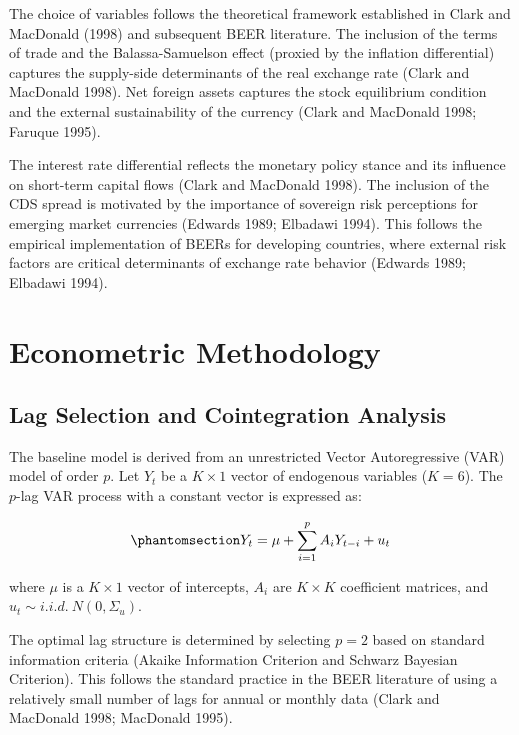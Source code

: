 \documentclass[
  manuscript=article,
  layout=publish,
  year=2026,
  volume=6,
]{den}
\begin{document}
The choice of variables follows the theoretical framework established in
Clark and MacDonald (1998) and subsequent BEER literature. The inclusion
of the terms of trade and the Balassa-Samuelson effect (proxied by the
inflation differential) captures the supply-side determinants of the
real exchange rate (Clark and MacDonald 1998). Net foreign assets
captures the stock equilibrium condition and the external sustainability
of the currency (Clark and MacDonald 1998; Faruque 1995).

The interest rate differential reflects the monetary policy stance and
its influence on short-term capital flows (Clark and MacDonald 1998).
The inclusion of the CDS spread is motivated by the importance of
sovereign risk perceptions for emerging market currencies (Edwards 1989;
Elbadawi 1994). This follows the empirical implementation of BEERs for
developing countries, where external risk factors are critical
determinants of exchange rate behavior (Edwards 1989; Elbadawi 1994).

\section{Econometric Methodology}\label{econometric-methodology}

\subsection{Lag Selection and Cointegration
Analysis}\label{lag-selection-and-cointegration-analysis}

The baseline model is derived from an unrestricted Vector Autoregressive
(VAR) model of order \(p\). Let \(Y_t\) be a \(K \times 1\) vector of
endogenous variables (\(K=6\)). The \(p\)-lag VAR process with a
constant vector is expressed as:

\begin{equation}\phantomsection\label{eq-var-general}{
Y_t = \mu + \sum_{i=1}^{p} A_i Y_{t-i} + u_t
}\end{equation}

where \(\mu\) is a \(K \times 1\) vector of intercepts, \(A_i\) are
\(K \times K\) coefficient matrices, and
\(u_t \sim i.i.d.\ N(0, \Sigma_u)\).

The optimal lag structure is determined by selecting \(p=2\) based on
standard information criteria (Akaike Information Criterion and Schwarz
Bayesian Criterion). This follows the standard practice in the BEER
literature of using a relatively small number of lags for annual or
monthly data (Clark and MacDonald 1998; MacDonald 1995).
\end{document}
